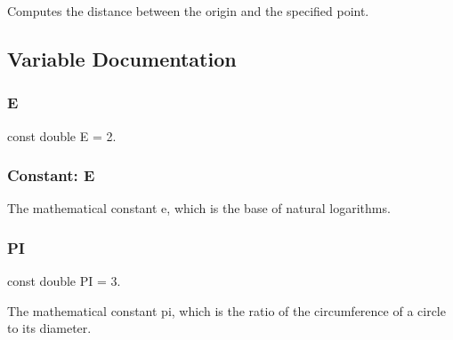 Computes the distance between the origin and the specified point. 



\subsection{Variable Documentation}
\mbox{\label{namespacesgl_1_1math_ab587ba72a9c23f238cb4fd70e2fdb545}} 
\subsubsection{\texorpdfstring{E}{E}}
{\footnotesize\ttfamily const double E = 2.}



\subsubsection*{Constant\+: E }

The mathematical constant e, which is the base of natural logarithms. 

\mbox{\label{namespacesgl_1_1math_a952eac791b596a61bba0a133a3bb439f}} 
\subsubsection{\texorpdfstring{PI}{PI}}
{\footnotesize\ttfamily const double PI = 3.}



The mathematical constant pi, which is the ratio of the circumference of a circle to its diameter. 

